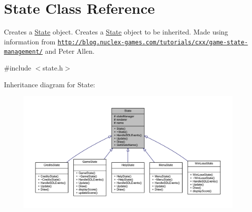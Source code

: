\hypertarget{class_state}{\section{State Class Reference}
\label{class_state}
}


Creates a \hyperlink{class_state}{State} object. Creates a \hyperlink{class_state}{State} object to be inherited. Made using information from \href{http://blog.nuclex-games.com/tutorials/cxx/game-state-management/}{\tt http\+://blog.\+nuclex-\/games.\+com/tutorials/cxx/game-\/state-\/management/} and Peter Allen.  




{\ttfamily \#include $<$state.\+h$>$}



Inheritance diagram for State\+:
\nopagebreak
\begin{figure}[H]
\begin{center}
\leavevmode
\includegraphics[width=350pt]{class_state__inherit__graph}
\end{center}
\end{figure}


